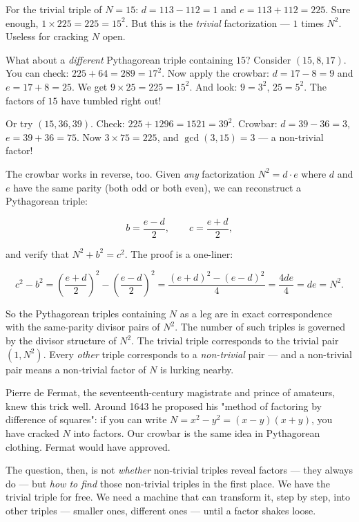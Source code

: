 For the trivial triple of $N = 15$: $d = 113 - 112 = 1$ and $e = 113 + 112 = 225$. Sure enough, $1 \times 225 = 225 = 15^2$. But this is the \textit{trivial} factorization --- $1$ times $N^2$. Useless for cracking $N$ open.

What about a \textit{different} Pythagorean triple containing $15$? Consider $(15, 8, 17)$. You can check: $225 + 64 = 289 = 17^2$. Now apply the crowbar: $d = 17 - 8 = 9$ and $e = 17 + 8 = 25$. We get $9 \times 25 = 225 = 15^2$. And look: $9 = 3^2$, $25 = 5^2$. The factors of $15$ have tumbled right out!

Or try $(15, 36, 39)$. Check: $225 + 1296 = 1521 = 39^2$. Crowbar: $d = 39 - 36 = 3$, $e = 39 + 36 = 75$. Now $3 \times 75 = 225$, and $\gcd(3, 15) = 3$ --- a non-trivial factor!

The crowbar works in reverse, too. Given \textit{any} factorization $N^2 = d \cdot e$ where $d$ and $e$ have the same parity (both odd or both even), we can reconstruct a Pythagorean triple:

\[b = \frac{e - d}{2}, \qquad c = \frac{e + d}{2},\]

and verify that $N^2 + b^2 = c^2$. The proof is a one-liner:

\[c^2 - b^2 = \left(\frac{e+d}{2}\right)^{\!2} - \left(\frac{e-d}{2}\right)^{\!2} = \frac{(e+d)^2 - (e-d)^2}{4} = \frac{4de}{4} = de = N^2.\]

So the Pythagorean triples containing $N$ as a leg are in exact correspondence with the same-parity divisor pairs of $N^2$. The number of such triples is governed by the divisor structure of $N^2$. The trivial triple corresponds to the trivial pair $(1, N^2)$. Every \textit{other} triple corresponds to a \textit{non-trivial} pair --- and a non-trivial pair means a non-trivial factor of $N$ is lurking nearby.

Pierre de Fermat, the seventeenth-century magistrate and prince of amateurs, knew this trick well. Around 1643 he proposed his "method of factoring by difference of squares": if you can write $N = x^2 - y^2 = (x-y)(x+y)$, you have cracked $N$ into factors. Our crowbar is the same idea in Pythagorean clothing. Fermat would have approved.


The question, then, is not \textit{whether} non-trivial triples reveal factors --- they always do --- but \textit{how to find} those non-trivial triples in the first place. We have the trivial triple for free. We need a machine that can transform it, step by step, into other triples --- smaller ones, different ones --- until a factor shakes loose.

